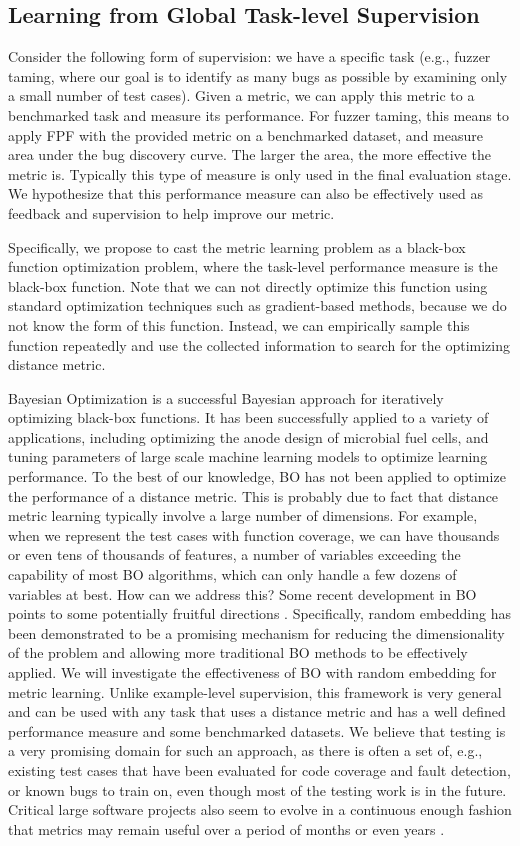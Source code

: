 \subsection{Learning from Global Task-level Supervision}
Consider the following form of supervision: we have a specific task
(e.g., fuzzer taming, where our goal is to identify as many bugs as
possible by examining only a small number of test cases). Given a
metric, we can apply this metric to a benchmarked task and measure its
performance. For fuzzer taming, this means to apply FPF with the
provided metric on a benchmarked dataset, and measure area under the
bug discovery curve. The larger the area, the more effective the
metric is. Typically this type of measure is only used in the final
evaluation stage. We hypothesize that this performance measure can
also be effectively used as feedback and supervision to help improve
our metric.

Specifically, we propose to cast the metric learning problem as a
black-box function optimization problem, where the task-level
performance measure is the black-box function. Note that we can not
directly optimize this function using standard optimization techniques
such as gradient-based methods, because we do not know the form of
this function. Instead, we can empirically sample this function
repeatedly and use the collected information to search for the
optimizing distance metric.

Bayesian Optimization is a successful Bayesian approach for
iteratively optimizing black-box functions. It has been successfully
applied to a variety of applications, including optimizing the anode
design of microbial fuel cells, and tuning parameters of large scale
machine learning models to optimize learning performance. To the best
of our knowledge, BO has not been applied to optimize the performance
of a distance metric.  This is probably due to fact that distance
metric learning typically involve a large number of dimensions. For
example, when we represent the test cases with function coverage, we
can have thousands or even tens of thousands of features, a number of
variables exceeding the capability of most BO algorithms, which can
only handle a few dozens of variables at best. How can we address
this? Some recent development in BO points to some potentially
fruitful directions \cite{nando's 2013 paper}. Specifically, random
embedding has been demonstrated to be a promising mechanism for
reducing the dimensionality of the problem and allowing more
traditional BO methods to be effectively applied. We will investigate
the effectiveness of BO with random embedding for metric
learning. Unlike example-level supervision, this framework is very
general and can be used with any task that uses a distance metric and
has a well defined performance measure and some benchmarked datasets.
We believe that testing is a very promising domain for such an
approach, as there is often a set of, e.g., existing test cases that
have been evaluated for code coverage and fault detection, or known
bugs to train on, even though most of the testing work is in the
future.  Critical large software projects also seem to evolve in a
continuous enough fashion that metrics may remain useful over a period
of months or even years \cite{icst2014}.
